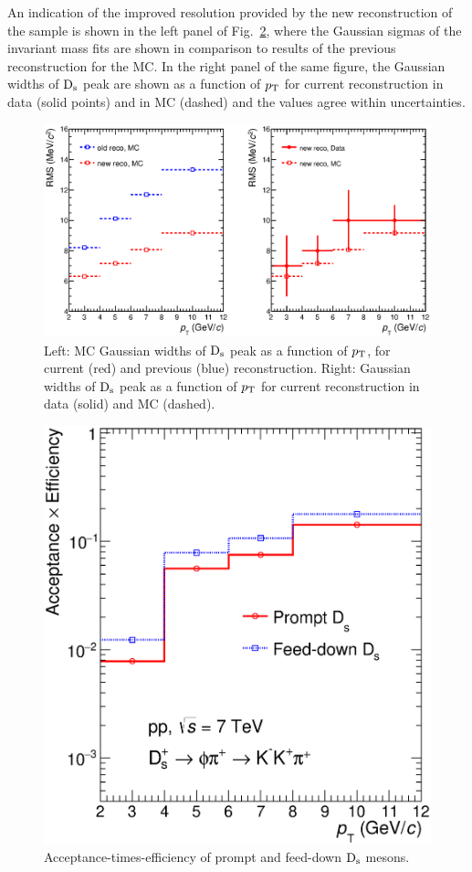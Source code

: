 An indication of the improved resolution provided by the new 
reconstruction of the sample is shown in the left panel of Fig.~\ref{fig:sigma4vs2}, where the 
Gaussian sigmas of the invariant mass fits are shown in comparison to 
results of the previous reconstruction for the MC. In the right
panel of the same figure, the Gaussian widths of ${\rm D_s}$ peak are shown 
as a function of $p_{\rm T}$ for current reconstruction in data (solid points)
and in MC (dashed) and the values agree within uncertainties. 
\begin{figure}[!hb]
\begin{center}
\includegraphics[width=.9\textwidth]{FigCap4/Resolutions_pass2_pass4.eps}
\caption{Left: MC Gaussian widths of ${\rm D_s}$ peak as a function of $p_{\rm T}$, for current (red) and previous (blue) reconstruction. Right: Gaussian widths of ${\rm D_s}$ peak as a function of $p_{\rm T}$ for current reconstruction in data (solid) and MC (dashed). }
\label{fig:sigma4vs2}
\end{center}
\end{figure}

\begin{figure}[!hb]
\begin{center}
\includegraphics[width=.52\textwidth]{FigCap4/AccEff_Ds_Pass4.eps}
\caption{Acceptance-times-efficiency of prompt and feed-down ${\rm D_s}$ mesons.}
\label{fig:sigma4vs2}
\end{center}
\end{figure}

